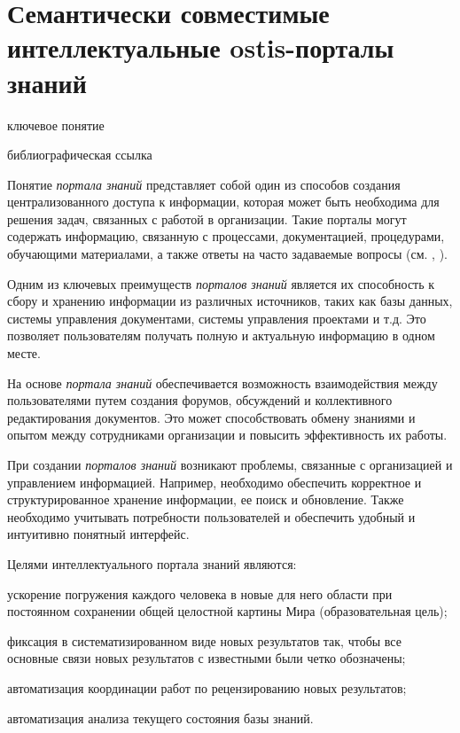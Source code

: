 \section{Семантически совместимые интеллектуальные ostis-порталы знаний}
{\label{sec_ostis_scientific_portal}} 

\begin{SCn}

\bigskip

\begin{scnrelfromlist}{ключевое понятие}
\end{scnrelfromlist}


\begin{scnrelfromlist}{библиографическая ссылка}
\end{scnrelfromlist}

\end{SCn}

Понятие \textit{портала знаний} представляет собой один из способов создания централизованного доступа к информации, которая может быть необходима для решения задач, связанных с работой в организации. Такие порталы могут содержать информацию, связанную с процессами, документацией, процедурами, обучающими материалами, а также ответы на часто задаваемые вопросы (см. , ).

Одним из ключевых преимуществ \textit{порталов знаний} является их способность к сбору и хранению информации из различных источников, таких как базы данных, системы управления документами, системы управления проектами и т.д. Это позволяет пользователям получать полную и актуальную информацию в одном месте.

На основе \textit{портала знаний} обеспечивается возможность взаимодействия между пользователями путем создания форумов, обсуждений и коллективного редактирования документов. Это может способствовать обмену знаниями и опытом между сотрудниками организации и повысить эффективность их работы.

При создании \textit{порталов знаний} возникают проблемы, связанные с организацией и управлением информацией. Например, необходимо обеспечить корректное и структурированное хранение информации, ее поиск и обновление. Также необходимо учитывать потребности пользователей и обеспечить удобный и интуитивно понятный интерфейс.

Целями интеллектуального портала знаний являются:
\begin{textitemize}
    \item ускорение погружения каждого человека в новые для него области при постоянном сохранении общей целостной картины Мира (образовательная цель);
    \item фиксация в систематизированном виде новых результатов так, чтобы все основные связи новых результатов с известными были четко обозначены;
    \item автоматизация координации работ по рецензированию новых результатов;
    \item автоматизация анализа текущего состояния базы знаний.
\end{textitemize}

